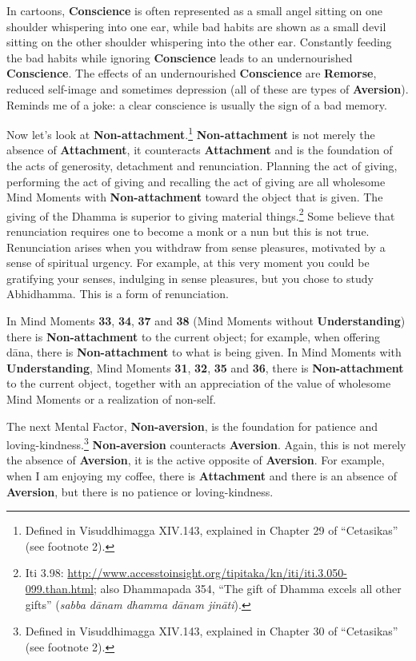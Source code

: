 In cartoons, \textbf{Conscience} is often represented as a small angel sitting on one shoulder whispering into one ear, while bad habits are shown as a small devil sitting on the other shoulder whispering into the other ear. Constantly feeding the bad habits while ignoring \textbf{Conscience} leads to an undernourished \textbf{Conscience}. The effects of an undernourished \textbf{Conscience} are \textbf{Remorse}, reduced self-image and sometimes depression (all of these are types of \textbf{Aversion}). Reminds me of a joke: a clear conscience is usually the sign of a bad memory.

Now let’s look at \textbf{Non-attachment}.\footnote{Defined in Visuddhimagga XIV.143, explained in Chapter 29 of “Cetasikas” (see footnote 2).} \textbf{Non-attachment} is not merely the absence of \textbf{Attachment}, it counteracts \textbf{Attachment} and is the foundation of the acts of generosity, detachment and renunciation. Planning the act of giving, performing the act of giving and recalling the act of giving are all wholesome Mind Moments with \textbf{Non-attachment} toward the object that is given. The giving of the Dhamma is superior to giving material things.\footnote{Iti 3.98: \url{http://www.accesstoinsight.org/tipitaka/kn/iti/iti.3.050-099.than.html}; also Dhammapada 354, “The gift of Dhamma excels all other gifts” (\textit{sabba dānam dhamma dānam jināti}).} Some believe that renunciation requires one to become a monk or a nun but this is not true. Renunciation arises when you withdraw from sense pleasures, motivated by a sense of spiritual urgency. For example, at this very moment you could be gratifying your senses, indulging in sense pleasures, but you chose to study Abhidhamma. This is a form of renunciation.

In Mind Moments \textbf{33}, \textbf{34}, \textbf{37} and \textbf{38} (Mind Moments without \textbf{Understanding}) there is \textbf{Non-attachment} to the current object; for example, when offering dāna, there is \textbf{Non-attachment} to what is being given. In Mind Moments with \textbf{Understanding}, Mind Moments \textbf{31}, \textbf{32}, \textbf{35} and \textbf{36}, there is \textbf{Non-attachment} to the current object, together with an appreciation of the value of wholesome Mind Moments or a realization of non-self.

The next Mental Factor, \textbf{Non-aversion}, is the foundation for patience and loving-kindness.\footnote{Defined in Visuddhimagga XIV.143, explained in Chapter 30 of “Cetasikas” (see footnote 2).} \textbf{Non-aversion} counteracts \textbf{Aversion}. Again, this is not merely the absence of \textbf{Aversion}, it is the active opposite of \textbf{Aversion}. For example, when I am enjoying my coffee, there is \textbf{Attachment} and there is an absence of \textbf{Aversion}, but there is no patience or loving-kindness.

